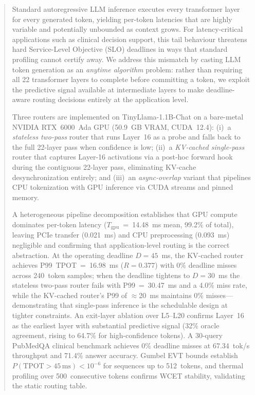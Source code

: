 \documentclass[conference]{IEEEtran}
\begin{document}
\begin{abstract}
Standard autoregressive LLM inference executes every transformer layer for
every generated token, yielding per-token latencies that are highly variable
and potentially unbounded as context grows.
For latency-critical applications such as clinical decision support, this
tail behaviour threatens hard Service-Level Objective (SLO) deadlines in
ways that standard profiling cannot certify away.
We address this mismatch by casting LLM token generation as an
\emph{anytime algorithm} problem: rather than requiring all 22 transformer
layers to complete before committing a token, we exploit the predictive
signal available at intermediate layers to make deadline-aware routing
decisions entirely at the application level.

Three routers are implemented on TinyLlama-1.1B-Chat on a bare-metal
NVIDIA RTX~6000~Ada GPU (50.9~GB VRAM, CUDA~12.4):
(i)~a \emph{stateless two-pass} router that runs Layer~16 as a probe
     and falls back to the full 22-layer pass when confidence is low;
(ii)~a \emph{KV-cached single-pass} router that captures Layer-16 activations
     via a post-hoc forward hook during the contiguous 22-layer pass,
     eliminating KV-cache desynchronization entirely; and
(iii)~an \emph{async-overlap} variant that pipelines CPU tokenization with
      GPU inference via CUDA streams and pinned memory.

A heterogeneous pipeline decomposition establishes that GPU compute
dominates per-token latency ($T_{\text{gpu}}$~=~14.48~ms mean, 99.2\%
of total), leaving PCIe transfer (0.021~ms) and CPU preprocessing (0.093~ms)
negligible and confirming that application-level routing is the correct
abstraction.
At the operating deadline $D=45$~ms, the KV-cached router achieves
P99~TPOT~=~16.98~ms ($R = 0.377$) with 0\% deadline misses across
240~token samples; when the deadline tightens to $D=30$~ms the
stateless two-pass router fails with P99~=~30.47~ms and a 4.0\%
miss rate, while the KV-cached router's P99 of $\approx$20~ms
maintains 0\% misses---demonstrating that single-pass inference
is the schedulable design at tighter constraints.
An exit-layer ablation over L5--L20 confirms Layer~16 as the earliest
layer with substantial predictive signal (32\% oracle agreement, rising to
64.7\% for high-confidence tokens).
A 30-query PubMedQA clinical benchmark achieves 0\% deadline misses at
67.34~tok/s throughput and 71.4\% answer accuracy.
Gumbel EVT bounds establish $P(\text{TPOT}>45\,\text{ms})<10^{-6}$
for sequences up to 512~tokens, and thermal profiling over
500~consecutive tokens confirms WCET stability, validating the
static routing table.
\end{abstract}
\end{document}
